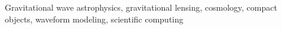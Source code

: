 Gravitational wave astrophysics, gravitational lensing, cosmology, compact objects, waveform modeling, scientific computing